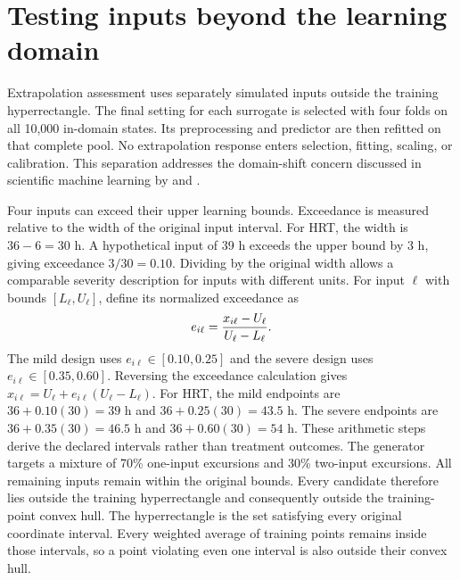\section{Testing inputs beyond the learning domain}

Extrapolation assessment uses separately simulated inputs outside the training hyperrectangle. The final setting for each surrogate is selected with four folds on all 10,000 in-domain states. Its preprocessing and predictor are then refitted on that complete pool. No extrapolation response enters selection, fitting, scaling, or calibration. This separation addresses the domain-shift concern discussed in scientific machine learning by \citet{Karniadakis2021} and \citet{Shen2023}.

Four inputs can exceed their upper learning bounds. Exceedance is measured relative to the width of the original input interval. For HRT, the width is $36-6=30$ h. A hypothetical input of 39 h exceeds the upper bound by 3 h, giving exceedance $3/30=0.10$. Dividing by the original width allows a comparable severity description for inputs with different units. For input $\ell$ with bounds $[L_\ell,U_\ell]$, define its normalized exceedance as
\begin{equation}
\equationname{Input exceedance beyond an upper training-domain bound}
e_{i\ell}=\frac{x_{i\ell}-U_\ell}{U_\ell-L_\ell}.
\label{eq:projection_domain_exceedance}
\end{equation}
The mild design uses $e_{i\ell}\in[0.10,0.25]$ and the severe design uses $e_{i\ell}\in[0.35,0.60]$. Reversing the exceedance calculation gives $x_{i\ell}=U_\ell+e_{i\ell}(U_\ell-L_\ell)$. For HRT, the mild endpoints are $36+0.10(30)=39$ h and $36+0.25(30)=43.5$ h. The severe endpoints are $36+0.35(30)=46.5$ h and $36+0.60(30)=54$ h. These arithmetic steps derive the declared intervals rather than treatment outcomes. The generator targets a mixture of 70\% one-input excursions and 30\% two-input excursions. All remaining inputs remain within the original bounds. Every candidate therefore lies outside the training hyperrectangle and consequently outside the training-point convex hull. The hyperrectangle is the set satisfying every original coordinate interval. Every weighted average of training points remains inside those intervals, so a point violating even one interval is also outside their convex hull.

